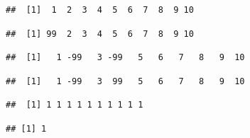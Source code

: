 \documentclass[krantz2]{krantz}\usepackage{knitr}
\begin{document}
\begin{knitrout}\footnotesize
{}\color{fgcolor}\begin{kframe}
\begin{alltt}
 \hlkwb{<-} \hlopt{:}
\end{alltt}
\begin{verbatim}
##  [1]  1  2  3  4  5  6  7  8  9 10
\end{verbatim}
\begin{alltt}
\hlstd{a[}\hlstd{]} \hlkwb{<-} 
\end{alltt}
\begin{verbatim}
##  [1] 99  2  3  4  5  6  7  8  9 10
\end{verbatim}
\begin{alltt}
 \hlkwb{<-} \hlopt{:}
\hlstd{b[}\hlstd{(}\hlstd{,}\hlstd{)]} \hlkwb{<-} \hlopt{-} 
\end{alltt}
\begin{verbatim}
##  [1]   1 -99   3 -99   5   6   7   8   9  10
\end{verbatim}
\begin{alltt}
 \hlkwb{<-} \hlopt{:}
\hlstd{c[}\hlstd{(}\hlstd{,}\hlstd{)]} \hlkwb{<-} \hlstd{(}\hlopt{-}\hlstd{,} \hlstd{)}
\end{alltt}
\begin{verbatim}
##  [1]   1 -99   3  99   5   6   7   8   9  10
\end{verbatim}
\begin{alltt}
 \hlkwb{<-} \hlopt{:}
\hlstd{d[}\hlstd{]} \hlkwb{<-}  
\end{alltt}
\begin{verbatim}
##  [1] 1 1 1 1 1 1 1 1 1 1
\end{verbatim}
\begin{alltt}
 \hlkwb{<-} \hlopt{:}
 \hlkwb{<-}   
\end{alltt}
\begin{verbatim}
## [1] 1
\end{verbatim}
\end{kframe}
\end{knitrout}
\end{document}
